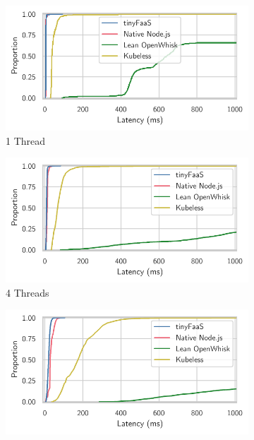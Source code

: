 \begin{figure}
    \begin{subfigure}{0.49\linewidth}
        \centering
        \includegraphics[width=\linewidth]{./fig/ecdf-pi-1.pdf}
        \caption{1 Thread}
        \label{fig:pigraph:1}
    \end{subfigure}
    \hfill
    \begin{subfigure}{0.49\linewidth}
        \centering
        \includegraphics[width=\linewidth]{./fig/ecdf-pi-4.pdf}
        \caption{4 Threads}
        \label{fig:pigraph:4}
    \end{subfigure}
    \vfill
    \begin{subfigure}{0.49\linewidth}
        \centering
        \includegraphics[width=\linewidth]{./fig/ecdf-pi-16.pdf}

\end{subfigure}
\end{figure}
